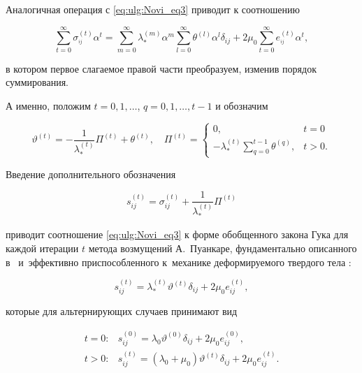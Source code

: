 Аналогичная операция с \eqref{eq:ulg:Novi_eq3} приводит к соотношению

\[

\sum _{t=0}^{\infty }\sigma _{^{i j} }^{(t)} \alpha ^{t}  =\sum _{m=0}^{\infty }\lambda _{*}^{(m)} \alpha ^{m}  \sum _{l=0}^{\infty }\theta ^{(l)} \alpha ^{l}  \delta _{i j} +2\mu _{0}  \sum _{t=0}^{\infty }e _{^{i j} }^{(t)} \alpha ^{t}  ,

\] 

в котором первое слагаемое правой части преобразуем, изменив порядок суммирования. 

А именно, положим $t=0, 1, \dots$, $ q=0, 1, \dots, t-1$ и обозначим

\[

\vartheta ^{(t)} =-\frac{1}{\lambda _{*}^{(t)} } \Pi ^{(t)} +\theta ^{(t)} ,

\quad 

  \Pi ^{(t)} =\left\{\begin{array}{cl} 0, &t=0  \\ 

  -\lambda _{*}^{(t)} \sum _{q=0}^{t-1}\theta ^{(q)}  , & t>0. \end{array}\right. 

\] 

Введение дополнительного обозначения 

\begin{equation} \label{eq:ulg:Novi_eq6} 

s_{i j}^{\left(t\right)} =\sigma _{i j}^{\left(t\right)} +\frac{1}{\lambda _{*}^{(t)} } \Pi ^{(t)}  

\end{equation} 

приводит соотношение \eqref{eq:ulg:Novi_eq3} к форме обобщенного закона Гука для каждой итерации $t$ метода возмущений А.~Пуанкаре, фундаментально описанного в~\cite{Novi_bib5} и~эффективно приспособленного к~механике деформируемого твердого тела \cite{Novi_bib6}:

\[

s_{i j}^{(t)} =\lambda _{*}^{(t)} \vartheta ^{(t)} \delta _{i j} +2\mu _{0}  e _{i j}^{(t)} ,

\] 

которые для альтернирующих случаев принимают вид

\[

\begin{array}{rl}

t=0: & s_{i j}^{(0)} =\lambda _{0} \vartheta ^{(0)} \delta _{i j} +2\mu _{0}  e _{i j}^{(0)} ,\\[2mm]

t>0: & s_{i j}^{(t)} =(\lambda _{0} +\mu _{0} )\vartheta ^{(t)} \delta _{i j} +2\mu _{0}  e _{i j}^{(t)} .

\end{array}

\] 


